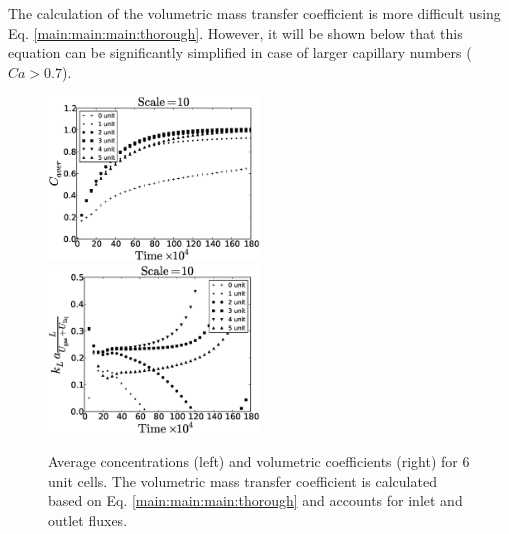 \documentclass{article}
\begin{document}
The calculation of the  volumetric mass transfer coefficient is more difficult
using Eq. \ref{main:main:main:thorough}. However, it will be shown below that
this equation can be significantly simplified in case of larger capillary
numbers ($Ca>0.7$).

\begin{figure}[htb!]
\includegraphics[width=0.5\textwidth]{Figures/aver_units6scale10.eps}\hfill
\includegraphics[width=0.5\textwidth]{Figures/right_def_6scale10.eps}\\
\caption{Average concentrations (left) and volumetric coefficients (right) for $6$ unit cells. The
volumetric
mass transfer coefficient is calculated based on Eq. \ref{main:main:main:thorough} and accounts for inlet
and outlet fluxes. \label{fig:unit:6}}
\end{figure}
\end{document}
